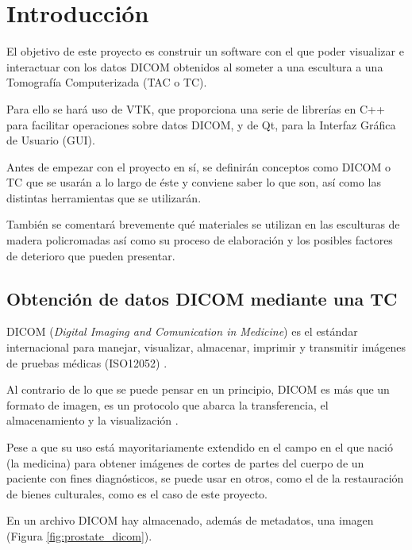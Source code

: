\chapter{Introducción}

El objetivo de este proyecto es construir un software con el que poder visualizar e interactuar con los datos DICOM obtenidos al someter a una escultura a una Tomografía Computerizada (TAC o TC). 

Para ello se hará uso de VTK, que proporciona una serie de librerías en C++ para facilitar operaciones sobre datos DICOM, y de Qt, para la Interfaz Gráfica de Usuario (GUI).

Antes de empezar con el proyecto en sí, se definirán conceptos como DICOM o TC que se usarán a lo largo de éste y conviene saber lo que son, así como las distintas herramientas que se utilizarán. 

También se comentará brevemente qué materiales se utilizan en las esculturas de madera policromadas así como su proceso de elaboración y los posibles factores de deterioro que pueden presentar.

\section{Obtención de datos DICOM mediante una TC}

DICOM (\textit{Digital Imaging and Comunication in Medicine}) es el estándar internacional para manejar, visualizar, almacenar, imprimir y transmitir imágenes de pruebas médicas (ISO12052) \cite{about_dicom}. 

Al contrario de lo que se puede pensar en un principio, DICOM es más que un formato de imagen, es un protocolo que abarca la transferencia, el almacenamiento y la visualización \cite{dicom_intro_and_guide}.

Pese a que su uso está mayoritariamente extendido en el campo en el que nació (la medicina) para obtener imágenes de cortes de partes del cuerpo de un paciente con fines diagnósticos, se puede usar en otros, como el de la restauración de bienes culturales, como es el caso de este proyecto.

En un archivo DICOM hay almacenado, además de metadatos, una imagen \cite{dicom_classes_vtk} (Figura \ref{fig:prostate_dicom}).

